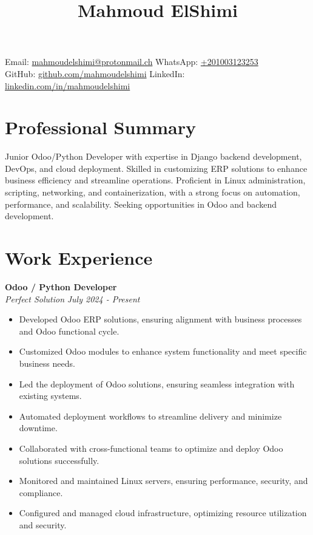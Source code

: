 \documentclass[letterpaper, 10pt]{article}
\author{}
\date{}
\title{\Huge \textbf{Mahmoud ElShimi}}
\begin{document}
\maketitle

\noindent
Email: \href{mailto:mahmoudelshimi@protonmail.ch}{mahmoudelshimi@protonmail.ch} \hfill
WhatsApp: \href{https://wa.me/201003123253?text=Hey,\%20I\%20came\%20from\%20your%20CV}{+201003123253 \hspace{2.4cm}} \\
GitHub: \href{https://github.com/mahmoudelshimi}{github.com/mahmoudelshimi} \hfill
LinkedIn: \href{https://www.linkedin.com/in/mahmoudelshimi}{linkedin.com/in/mahmoudelshimi}

\section*{Professional Summary}
Junior Odoo/Python Developer with expertise in Django backend development, DevOps, and cloud deployment. Skilled in customizing ERP solutions to enhance business efficiency and streamline operations. Proficient in Linux administration, scripting, networking, and containerization, with a strong focus on automation, performance, and scalability. Seeking opportunities in Odoo and backend development.

\section*{Work Experience}
\noindent\textbf{Odoo / Python Developer}\\
\textit{Perfect Solution} \hfill \textit{July 2024 - Present}
\begin{itemize}[leftmargin=*]
    \item Developed Odoo ERP solutions, ensuring alignment with business processes and Odoo functional cycle.
    \item Customized Odoo modules to enhance system functionality and meet specific business needs.
    \item Led the deployment of Odoo solutions, ensuring seamless integration with existing systems.
    \item Automated deployment workflows to streamline delivery and minimize downtime.
    \item Collaborated with cross-functional teams to optimize and deploy Odoo solutions successfully.
    \item Monitored and maintained Linux servers, ensuring performance, security, and compliance.
    \item Configured and managed cloud infrastructure, optimizing resource utilization and security.
\end{itemize}
\end{document}
